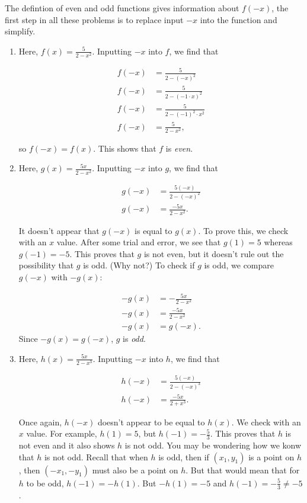 \documentclass[nooutcomes]{ximera}
\begin{document}
\begin{explanation}
The defintion of even and odd functions gives information about $f(-x)$, the first step in all these problems is to replace input $-x$ into the function and simplify.

\begin{enumerate}
\item Here, $f(x) = \frac{5}{2 - x^2}$. Inputting $-x$ into $f$, we find that

\begin{align*}
f(-x) & = \frac{5}{2 - (-x)^2}\\
f(-x) & = \frac{5}{2 - (-1 \cdot x)^2}\\
f(-x) & = \frac{5}{2 - (-1)^2 \cdot x^2}\\
f(-x) & = \frac{5}{2 - x^2},
\end{align*}

so $f(-x) = f(x)$. This shows that $f$ is \emph{even}. 

\item Here, $g(x) = \frac{5x}{2 - x^2}$. Inputting $-x$ into $g$, we find that

\begin{align*}
g(-x) & = \frac{5(-x)}{2 - (-x)^2}\\
g(-x) & = \frac{-5x}{2 - x^2}.
\end{align*}

It doesn't appear that $g(-x)$ is equal to $g(x)$. To prove this, we check with an $x$ value. After some trial and error, we see that $g(1) = 5$ whereas $g(-1) = -5$. This proves that $g$ is not even, but it doesn't rule out the possibility that $g$ is odd. (Why not?) To check if $g$ is odd, we compare $g(-x)$ with $-g(x)$:

\begin{align*}
-g(x) & = -\frac{5x}{2 - x^2} \\
-g(x) & = \frac{-5x}{2 - x^2} \\
-g(x) & = g(-x).
\end{align*}
Since $-g(x) = g(-x)$, $g$ is \emph{odd}.

\item Here, $h(x) = \frac{5x}{2 - x^3}$. Inputting $-x$ into $h$, we find that 

\begin{align*}
h(-x) & = \frac{5(-x)}{2 - (-x)^3} \\
h(-x) & = \frac{-5x}{2 + x^3}.
\end{align*}

Once again, $h(-x)$ doesn't appear to be equal to $h(x)$. We check with an $x$ value. For example, $h(1) = 5$, but $h(-1) = -\frac{5}{3}$. This proves that $h$ is not even and it also shows $h$ is not odd. You may be wondering how we konw that $h$ is not odd.  Recall that when $h$ is odd, then if $(x_1,y_1)$ is a point on $h$, then $(-x_1,-y_1)$ must also be a point on $h$.  But that would mean that for $h$ to be odd, $h(-1)=-h(1)$.  But $-h(1)=-5$ and $h(-1)= -\frac{5}{3} \neq -5$.

\end{enumerate}
\end{explanation}
\end{document}
